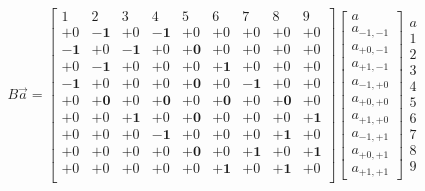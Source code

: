 \documentclass{article}
\newcommand{\0}{\mathbf{0}}
\newcommand{\1}{\mathbf{1}}
\newcommand{\2}{\mathbf{2}}
\newcommand{\3}{\mathbf{3}}
\newcommand{\4}{\mathbf{4}}
\newcommand{\5}{\mathbf{5}}
\newcommand{\6}{\mathbf{6}}
\newcommand{\7}{\mathbf{7}}
\newcommand{\8}{\mathbf{8}}
\begin{document}
\begin{small}
\setlength\arraycolsep{1.3pt}  
\begin{align*}  
  B\vec{a}=  
  \left[
   \begin{array}{rrrrrrrrr}  
     1& 2& 3& 4& 5& 6& 7& 8& 9\\    %
    +0&-\1&+0&-\1&+0&+0&+0&+0&+0\\    %
    -\1&+0&-\1&+0&+\0&+0&+0&+0&+0\\    %
    +0&-\1&+0&+0&+0&+\1&+0&+0&+0\\    %
    -\1&+0&+0&+0&+\0&+0&-\1&+0&+0\\    %
    +0&+\0&+0&+\0&+0&+\0&+0&+\0&+0\\    %
    +0&+0&+\1&+0&+\0&+0&+0&+0&+\1\\    %
    +0&+0&+0&-\1&+0&+0&+0&+\1&+0\\    %
    +0&+0&+0&+0&+\0&+0&+\1&+0&+\1\\    %
    +0&+0&+0&+0&+0&+\1&+0&+\1&+0\\    %
   \end{array}
  \right]
  \left[
  \begin{array}{c}  
    a\\a_{-1,-1}\\a_{+0,-1}\\a_{+1,-1}\\
       a_{-1,+0}\\a_{+0,+0}\\a_{+1,+0}\\
       a_{-1,+1}\\a_{+0,+1}\\a_{+1,+1}
  \end{array}
  \right]
  \begin{array}{c}  
    a\\1\\2\\3\\4\\5\\
    6\\7\\8\\9
  \end{array}
\end{align*}
\end{small}
%
\end{document}
